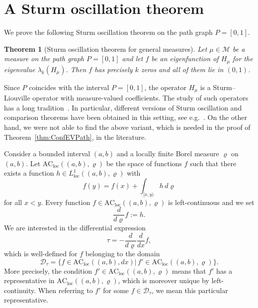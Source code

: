 \documentclass[reqno]{amsart}
\theoremstyle{plain}
\newtheorem{thm}{Theorem}[section]
\theoremstyle{definition}
\theoremstyle{remark}
\numberwithin{equation}{section}
\newcommand{\cM}{\mathcal{M}}
\begin{document}

\appendix

\section{A Sturm oscillation theorem} \label{sec:SturmOscillationTheorem}
We prove the following Sturm oscillation theorem on the path graph $P = [0,1]$.

\begin{thm}[Sturm oscillation theorem for general measures] \label{Thm: Sturm oscillation}
	Let $\mu \in \cM$ be a measure on the path graph $P=[0,1]$ and let $f$ be an eigenfunction of $H_\mu$ for the eigenvalue $\lambda_k(H_\mu)$. Then $f$ has precisely $k$ zeros and all of them lie in $(0,1)$.
\end{thm}
Since $P$ coincides with the interval $P=[0,1]$, the operator $H_\mu$ is a Sturm--Liouville operator with measure-valued coefficients. The study of such operators has a long tradition~\cite{feller, kk}. In particular, different versions of Sturm oscillation and comparison theorems have been obtained in this setting, see e.g.~\cite{App: no controll at the boundary,  App: Dirichlet-case,App: Comparison results,  App: Volkmer}. On the other hand, we were not able to find the above variant, which is needed in the proof of Theorem~\ref{thm:ConfEVPath}, in the literature.

Consider a bounded interval $(a,b)$ and a locally finite Borel measure $\varrho$ on $(a,b)$. Let $\mathrm{AC}_{\mathrm{loc}}((a,b), \varrho)$ be the space of functions $f$ such that there exists a function $h \in L_{\mathrm{loc}}^1((a,b), \varrho )$ with
\[
f(y) = f(x) + \int_{[x,y)} h \, d\varrho
\]
for all $x<y$. Every function $f \in \mathrm{AC}_{\mathrm{loc}}((a,b), \varrho)$ is left-continuous and we set
\[
\frac{d}{d \varrho} f := h.
\]
We are interested in the differential expression
\[
\tau = - \frac{d}{d\varrho} \frac{d}{dx} f,
\]
which is well-defined for $f$ belonging to the domain
\[
\mathcal{D}_\tau = \big \{f \in \mathrm{AC}_{\mathrm{loc}}((a,b), dx)| \, f' \in \mathrm{AC}_{\mathrm{loc}}((a,b), \varrho) \big \}.
\]
More precisely, the condition $f' \in \mathrm{AC}_{\mathrm{loc}}((a,b), \varrho)$ means that $f'$ has a representative in $ \mathrm{AC}_{\mathrm{loc}}((a,b) ,\varrho)$, which is moreover unique by left-continuity. When referring to $f'$ for some $f \in \mathcal{D}_\tau$, we mean this particular representative.
\end{document}
